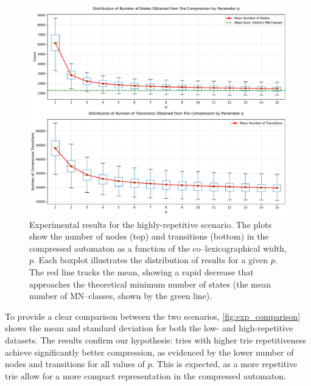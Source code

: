 \begin{figure}[H]
    \centering
    \includegraphics[width=1\linewidth]{Immagini/tree_compression_analysis_high.pdf}
    \caption{Experimental results for the highly-repetitive scenario. The plots show the number of nodes (top) and transitions (bottom) in the compressed automaton as a function of the co--lexicographical width, $p$. Each boxplot illustrates the distribution of results for a given $p$. The red line tracks the mean, showing a rapid decrease that approaches the theoretical minimum number of states (the mean number of MN--classes, shown by the green line).}
    \label{fig:exp_high_rep}
\end{figure}

To provide a clear comparison between the two scenarios, \cref{fig:exp_comparison} shows the mean and standard deviation for both the low- and high-repetitive datasets. The results confirm our hypothesis: tries with higher trie repetitiveness achieve significantly better compression, as evidenced by the lower number of nodes and transitions for all values of $p$. This is expected, as a more repetitive trie allow for a more compact representation in the compressed automaton.

